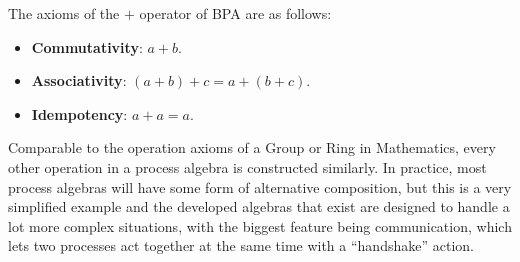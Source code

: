 \documentclass[../hons_project.tex]{subfiles}
\begin{document}
The axioms of the $+$ operator of BPA are as follows:
\begin{itemize}
	\item \textbf{Commutativity}: $a + b$.
	\item \textbf{Associativity}: $(a + b) + c = a + (b + c)$.
	\item \textbf{Idempotency}: $a + a = a$.
\end{itemize}
Comparable to the operation axioms of a Group or Ring in Mathematics, every other operation in a process algebra is constructed similarly. In practice, most process algebras will have some form of alternative composition, but this is a very simplified example and the developed algebras that exist are designed to handle a lot more complex situations, with the biggest feature being communication, which lets two processes act together at the same time with a ``handshake'' action.
\end{document}
